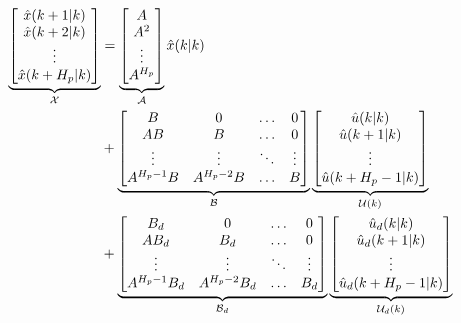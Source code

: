 \begin{equation}
\begin{aligned}
	  \underbrace{\begin{bmatrix}
	  \hat{x}(k+1|k) 	\\
	  \hat{x}(k+2|k) 	\\
	  \vdots 			\\
	  \hat{x}(k+H_p|k) 	\\
	   \end{bmatrix}}_{\CMcal{X}}
	 &=
	\underbrace{\begin{bmatrix}
		A \\
		A^2 \\
		\vdots \\
		A^{H_p} \\
	\end{bmatrix}}_{\CMcal{A}}
	\hat{x}(k|k) \\&+
	\underbrace{\begin{bmatrix}
		B 		 &0			 &\hdots	& 0		\\
		AB  	 &B  		 & \hdots& 0		\\
		\vdots 	 &\vdots	 & \ddots&\vdots	\\
		A^{H_p-1}B&A^{H_p-2}B&\hdots &B 
    \end{bmatrix}}_{\CMcal{B}}
    	\underbrace{\begin{bmatrix}
	\hat{u}(k|k)\\
	\hat{u}(k+1|k)\\
	\vdots\\
	\hat{u}(k+H_p-1|k)
	\end{bmatrix}}_{\CMcal{U}(k)} \\ &+ 
    \underbrace{\begin{bmatrix}
    	B_d 	    &0	         &\hdots & 0		\\
		AB_d  	    &B_d  	     & \hdots& 0		\\
		\vdots 	    &\vdots	     & \ddots&\vdots	\\
		A^{H_p-1}B_d&A^{H_p-2}B_d&\hdots &B_d 
	  \end{bmatrix}}_{\CMcal{B}_d} 
	\underbrace{\begin{bmatrix}
	\hat{u}_d(k|k)\\
	\hat{u}_d(k+1|k)\\
	\vdots\\
	\hat{u}_d(k+H_p-1|k)
	\end{bmatrix}}_{\CMcal{U}_d(k)}
	\end{aligned}
\end{equation}

